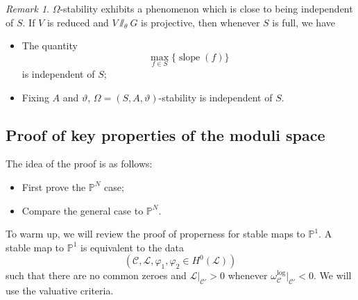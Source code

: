 \documentclass[10pt,oldfontcommands,oneside]{memoir}
\theoremstyle{definition}
\theoremstyle{remark}
\newtheorem{rmk}[thm]{Remark}
\theoremstyle{plain}
\theoremstyle{definition}
\theoremstyle{remark}
\renewcommand{\P}{\mathbb{P}}
\newcommand{\mc}[1]{\mathcal{#1}}
\newcommand{\on}[1]{\operatorname{#1}}
\newcommand{\1}{\mathbf{1}}
\newcommand{\2}{\mathbf{2}}
\newcommand{\3}{\mathbf{3}}
\begin{document}
\begin{rmk}
    $\Omega$-stability exhibits a phenomenon which is close to being independent of $S$. If $V$ is reduced and $V \sslash_{\theta} G$ is projective, then whenever $S$ is full, we have
    \begin{itemize}
        \item The quantity
            \[ \max_{f \in S} \{ \on{slope}(f)\} \]
            is independent of $S$;
        \item Fixing $A$ and $\vartheta$, $\Omega = (S,A,\vartheta)$-stability is independent of $S$.
    \end{itemize}
\end{rmk}

\subsection{Proof of key properties of the moduli space}%
\label{sub:Proof of key properties of the moduli space}

The idea of the proof is as follows:
\begin{itemize}
    \item First prove the $\P^N$ case;
    \item Compare the general case to $\P^N$.
\end{itemize}

To warm up, we will review the proof of properness for stable maps to $\P^1$. A stable map to $\P^1$ is equivalent to the data 
\[ (\mc{C}, \mc{L}, \varphi_1, \varphi_2 \in H^0(\mc{L})) \]
such that there are no common zeroes and $\mc{L}|_{\mc{C}'} > 0$ whenever $\omega_{\mc{C}}^{\log}|_{\mc{C}'} < 0$. We will use the valuative criteria.
\end{document}
